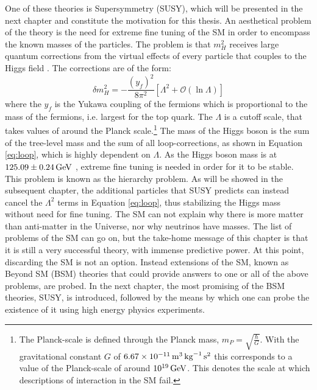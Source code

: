 One of these theories is Supersymmetry (SUSY), which will be presented in the next chapter and constitute the motivation for this thesis. 
\newpara
\noindent\justify
An aesthetical problem of the theory is the need for extreme fine tuning of the SM in order to encompass the known masses of the particles. 
The problem is that $m_{H}^{2}$ receives large quantum corrections from the virtual effects of every particle that couples to the Higgs field \cite{Martin:1997ns}. 
The corrections are of the form:
\begin{equation}
\delta m_{H}^{2}=-\frac{(y_{f})^{2}}{8\pi^{2}}\left[ \Lambda^{2} + \mathcal{O}\left(\ln\Lambda\right)\right] 
\label{eq:loop}
\end{equation}
where the $y_{f}$ is the Yukawa coupling of the fermions which is proportional to the mass of the fermions, i.e. largest for the top quark. 
The $\Lambda$ is a cutoff scale, that takes values of around the Planck scale.\footnote{The Planck-scale is defined through the Planck mass, $m_{P}=\sqrt{\frac{\hbar}{G}}$. With the gravitational constant $G$ of $6.67\times10^{-11}\,\text{m}^{3}\,\text{kg}^{-1}\,\text{s}^{2}$ this corresponds to a value of the Planck-scale of around $10^{19}\,\text{Ge\hspace{-.08em}V}$. This denotes the scale at which descriptions of interaction in the SM fail.} 
The mass of the Higgs boson is the sum of the tree-level mass and the sum of all loop-corrections, as shown in Equation \ref{eq:loop}, which is highly dependent on $\Lambda$. 
As the Higgs boson mass is at $125.09\pm0.24\,\text{Ge\hspace{-.08em}V}$ \cite{Olive_2016}, extreme fine tuning is needed in order for it to be stable. 
This problem is known as the hierarchy problem. 
As will be showed in the subsequent chapter, the additional particles that SUSY predicts can instead cancel the $\Lambda^{2}$ terms in Equation \ref{eq:loop}, thus stabilizing the Higgs mass without need for fine tuning.
\newpara
\noindent\justify
The SM can not explain why there is more matter than anti-matter in the Universe, nor why neutrinos have masses. 
The list of problems of the SM can go on, but the take-home message of this chapter is that it is still a very successful theory, with immense predictive power. 
At this point, discarding the SM is not an option. 
Instead extensions of the SM, known as Beyond SM (BSM) theories that could provide answers to one or all of the above problems, are probed. 
In the next chapter, the most promising of the BSM theories, SUSY, is introduced, followed by the means by which one can probe the existence of it using high energy physics experiments.  
